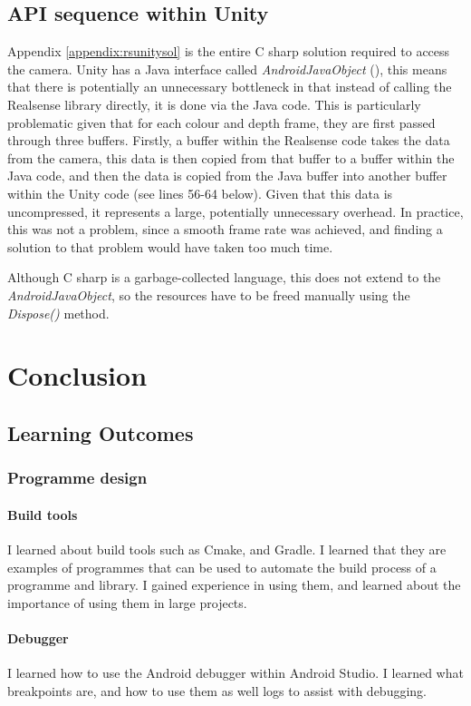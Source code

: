     \subsection{API sequence within Unity}
    Appendix \ref{appendix:rsunitysol} is the entire C sharp solution required to access the camera. Unity has a Java interface called {\slshape AndroidJavaObject} (\cite{unityandroidjavaobject}), this means that there is potentially an unnecessary bottleneck in that instead of calling the Realsense library directly, it is done via the Java code. This is particularly problematic given that for each colour and depth frame, they are first passed through three buffers. Firstly, a buffer within the Realsense code takes the data from the camera, this data is then copied from that buffer to a buffer within the Java code, and then the data is copied from the Java buffer into another buffer within the Unity code (see lines 56-64 below). Given that this data is uncompressed, it represents a large, potentially unnecessary overhead. In practice, this was not a problem, since a smooth frame rate was achieved, and finding a solution to that problem would have taken too much time.

    Although C sharp is a garbage-collected language, this does not extend to the {\slshape AndroidJavaObject}, so the resources have to be freed manually using the {\slshape Dispose()} method.
    

\section{Conclusion}
    \subsection{Learning Outcomes}
        \subsubsection{Programme design}
            \paragraph{Build tools}
            I learned about build tools such as Cmake, and Gradle. I learned that they are examples of programmes that can be used to automate the build process of a programme and library. I gained experience in using them, and learned about the importance of using them in large projects.
            \paragraph{Debugger}
            I learned how to use the Android debugger within Android Studio. I learned what breakpoints are, and how to use them as well logs to assist with debugging.
